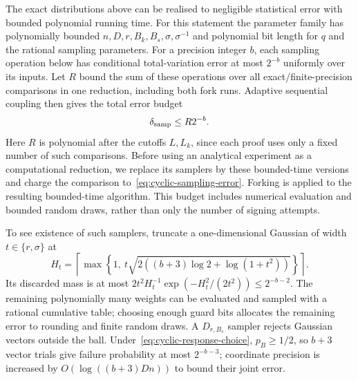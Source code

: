 \documentclass[lettersize,journal]{IEEEtran}
\begin{document}
The exact distributions above can be realised to negligible statistical error with bounded polynomial running time. For this statement the parameter family has polynomially bounded $n,D,r,B_k,B_s,\sigma,\sigma^{-1}$ and polynomial bit length for $q$ and the rational sampling parameters. For a precision integer $b$, each sampling operation below has conditional total-variation error at most $2^{-b}$ uniformly over its inputs. Let $R$ bound the sum of these operations over all exact/finite-precision comparisons in one reduction, including both fork runs. Adaptive sequential coupling then gives the total error budget
\begin{equation}\label{eq:cyclic-sampling-error}
	\delta_{\rm samp}\le R2^{-b}.
\end{equation}
Here $R$ is polynomial after the cutoffs $L,L_k$, since each proof uses only a fixed number of such comparisons. Before using an analytical experiment as a computational reduction, we replace its samplers by these bounded-time versions and charge the comparison to~\eqref{eq:cyclic-sampling-error}. Forking is applied to the resulting bounded-time algorithm. This budget includes numerical evaluation and bounded random draws, rather than only the number of signing attempts.

To see existence of such samplers, truncate a one-dimensional Gaussian of width $t\in\{r,\sigma\}$ at
\[
H_t=\left\lceil\max\left\{1,\ t\sqrt{2((b+3)\log2+\log(1+t^2))}\right\}\right\rceil.
\]
Its discarded mass is at most $2t^2H_t^{-1}\exp(-H_t^2/(2t^2))\le2^{-b-2}$. The remaining polynomially many weights can be evaluated and sampled with a rational cumulative table; choosing enough guard bits allocates the remaining error to rounding and finite random draws. A $D_{r,B_s}$ sampler rejects Gaussian vectors outside the ball. Under~\eqref{eq:cyclic-response-choice}, $p_B\ge1/2$, so $b+3$ vector trials give failure probability at most $2^{-b-3}$; coordinate precision is increased by $O(\log((b+3)Dn))$ to bound their joint error.
\end{document}
